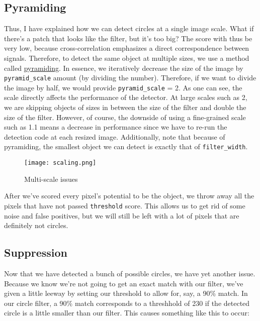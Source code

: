 \documentclass[11pt]{article}
\begin{document}
\subsection{Pyramiding}
Thus, I have explained how we can detect circles at a single image scale.  What if there's a patch that looks like the filter, but it's too big?  The score with thus be very low, because cross-correlation emphasizes a direct correspondence between signals.  Therefore, to detect the same object at multiple sizes, we use a method called \href{http://en.wikipedia.org/wiki/Pyramid_(image_processing)}{pyramiding}.  In essence, we iteratively decrease the size of the image by \texttt{pyramid\_scale} amount (by dividing the number).  Therefore, if we want to divide the image by half, we would provide \texttt{pyramid\_scale} = 2.  As one can see, the scale directly affects the performance of the detector.  At large scales such as 2, we are skipping objects of sizes in between the size of the filter and double the size of the filter.  However, of course, the downside of using a fine-grained scale such as 1.1 means a decrease in performance since we have to re-run the detection code at each resized image.  Additionally, note that because of pyramiding, the smallest object we can detect is exactly that of \texttt{filter\_width}.

\begin{figure}[h]
\caption{Multi-scale issues}
\texttt{[image: scaling.png]}
\end{figure}

After we've scored every pixel's potential to be the object, we throw away all the pixels that have not passed \texttt{threshold} score.  This allows us to get rid of some noise and false positives, but we will still be left with a lot of pixels that are definitely not circles.

\subsection{Suppression}
Now that we have detected a bunch of possible circles, we have yet another issue.  Because we know we're not going to get an exact match with our filter, we've given a little leeway by setting our threshold to allow for, say, a 90\% match.  In our circle filter, a 90\% match corresponds to a threshhold of 230 if the detected circle is a little smaller than our filter.  This causes something like this to occur:
\end{document}
